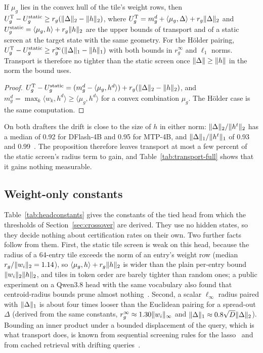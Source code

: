 \begin{proposition}\label{prop:static}
If $\mu_g$ lies in the convex hull of the tile's weight rows, then $U^{\rm T}_g-U^{\rm static}_g\ge r_g(\lVert \Delta\rVert_2-\lVert h\rVert_2)$, where $U^{\rm T}_g=m^d_g+\langle\mu_g,\Delta\rangle+r_g\lVert \Delta\rVert_2$ and $U^{\rm static}_g=\langle\mu_g,h\rangle+r_g\lVert h\rVert_2$ are the upper bounds of transport and of a static screen at the target state with the same geometry. For the Hölder pairing, $U^{\rm T}_g-U^{\rm static}_g\ge r^\infty_g(\lVert \Delta\rVert_1-\lVert h\rVert_1)$ with both bounds in $r^\infty_g$ and $\ell_1$ norms. Transport is therefore no tighter than the static screen once $\lVert \Delta\rVert\ge\lVert h\rVert$ in the norm the bound uses.
\end{proposition}
\begin{proof}
$U^{\rm T}_g-U^{\rm static}_g=(m^d_g-\langle\mu_g,h^d\rangle)+r_g(\lVert \Delta\rVert_2-\lVert h\rVert_2)$, and $m^d_g=\max_k\langle w_k,h^d\rangle\ge\langle\mu_g,h^d\rangle$ for a convex combination $\mu_g$. The Hölder case is the same computation.
\end{proof}
On both drafters the drift is close to the size of $h$ in either norm: $\lVert \Delta\rVert_2/\lVert h^t\rVert_2$ has a median of 0.92 for DFlash-4B and 0.95 for MTP-4B, and $\lVert \Delta\rVert_1/\lVert h^t\rVert_1$ of 0.93 and 0.99~. The proposition therefore leaves transport at most a few percent of the static screen's radius term to gain, and Table~\ref{tab:transport-full} shows that it gains nothing measurable.

\subsection{Weight-only constants}\label{app:head-constants}
Table~\ref{tab:headconstants} gives the constants of the tied head from which the thresholds of Section~\ref{sec:crossover} are derived. They use no hidden states, so they decide nothing about certification rates on their own. Two further facts follow from them. First, the static tile screen is weak on this head, because the radius of a 64-entry tile exceeds the norm of an entry's weight row (median $r_g/\lVert w_i\rVert_2=1.14$), so $\langle\mu_g,h\rangle+r_g\lVert h\rVert_2$ is wider than the plain per-entry bound $\lVert w_i\rVert_2\lVert h\rVert_2$, and tiles in token order are barely tighter than random ones; a public experiment on a Qwen3.8 head with the same vocabulary also found that centroid-radius bounds prune almost nothing~\cite{e142}. Second, a scalar $\ell_\infty$ radius paired with $\lVert \Delta\rVert_1$ is about four times looser than the Euclidean pairing for a spread-out $\Delta$ (derived from the same constants, $r^\infty_g\approx1.30\lVert w_i\rVert_\infty$ and $\lVert \Delta\rVert_1\approx0.8\sqrt D\lVert \Delta\rVert_2$). Bounding an inner product under a bounded displacement of the query, which is what transport does, is known from sequential screening rules for the lasso~\cite{dppscreening} and from cached retrieval with drifting queries~\cite{frieder2024}.

